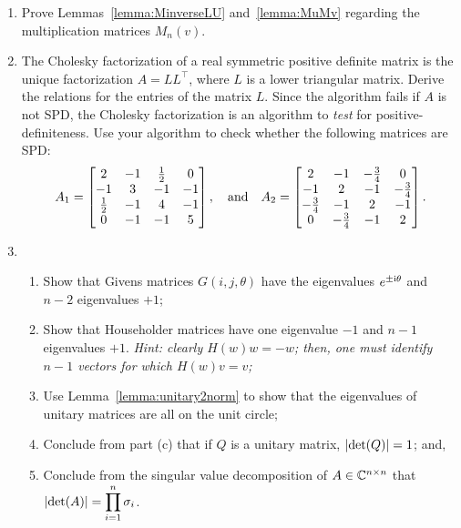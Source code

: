 \begin{enumerate}

\item Prove Lemmas~\ref{lemma:MinverseLU} and~\ref{lemma:MuMv} regarding the multiplication matrices $M_n(v)$.

\item The Cholesky factorization of a real symmetric positive definite matrix is the unique factorization $A=LL^\top$, where $L$ is a lower triangular matrix. Derive the relations for the entries of the matrix $L$. Since the algorithm fails if $A$ is not SPD, the Cholesky factorization is an algorithm to {\em test} for positive-definiteness. Use your algorithm to check whether the following matrices are SPD:
\[
A_1 = \begin{bmatrix} 2 & -1 & \tfrac{1}{2} & 0\\ -1 & 3 & -1 & -1\\ \tfrac{1}{2} & -1 & 4 & -1\\ 0 & -1 & -1 & 5\end{bmatrix},\quad{\rm and}\quad A_2 = \begin{bmatrix} 2 & -1 & -\tfrac{3}{4} & 0\\ -1 & 2 & -1 & -\tfrac{3}{4}\\ -\tfrac{3}{4} & -1 & 2 & -1\\ 0 & -\tfrac{3}{4} & -1 & 2\end{bmatrix}.
\]

\item \begin{enumerate}

\item Show that Givens matrices $G(i,j,\theta)$ have the eigenvalues $e^{\pm{\rm i}\theta}$ and $n-2$ eigenvalues $+1$;

\item Show that Householder matrices have one eigenvalue $-1$ and $n-1$ eigenvalues $+1$. {\em Hint: clearly $H(w)w=-w$; then, one must identify $n-1$ vectors for which $H(w)v = v$;}

\item Use Lemma~\ref{lemma:unitary2norm} to show that the eigenvalues of unitary matrices are all on the unit circle;

\item Conclude from part (c) that if $Q$ is a unitary matrix, $\left|{\det(Q)}\right| = 1$; and,

\item Conclude from the singular value decomposition of $A\in\mathbb{C}^{n\times n}$ that $\displaystyle \left|{\det(A)}\right| = \prod_{i=1}^n\sigma_i$.


\end{enumerate}
\end{enumerate}
